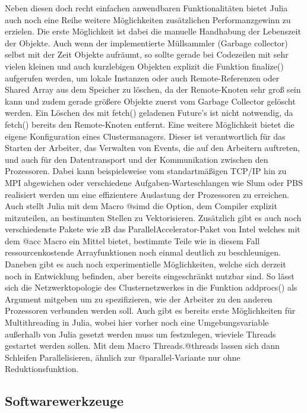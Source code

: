 \documentclass[proseminar,german,utf8]{zihpub}
\begin{document}
Neben diesen doch recht einfachen anwendbaren Funktionalitäten bietet Julia auch noch eine Reihe weitere Möglichkeiten zusätzlichen Performanzgewinn zu erzielen. Die erste Möglichkeit ist dabei die manuelle Handhabung der Lebenszeit der Objekte. Auch wenn der implementierte Müllsammler (Garbage collector) selbst mit der Zeit Objekte aufräumt, so sollte gerade bei Codezeilen mit sehr vielen kleinen und auch kurzlebigen Objekten explizit die Funktion finalize() aufgerufen werden, um lokale Instanzen oder auch Remote-Referenzen oder Shared Array aus dem Speicher zu löschen, da der Remote-Knoten sehr groß sein kann und zudem gerade größere Objekte zuerst vom Garbage Collector gelöscht werden. Ein Löschen des mit fetch() geladenen Future's ist nicht notwendig, da fetch() bereits den Remote-Knoten entfernt. Eine weitere Möglichkeit bietet die eigene Konfiguration eines Clustermanagers. Dieser ist verantwortlich für das Starten der Arbeiter, das Verwalten von Events, die auf den Arbeitern auftreten, und auch für den Datentransport und der Kommunikation zwischen den Prozessoren. Dabei kann beispielsweise vom standartmäßigen TCP/IP hin zu MPI abgewichen oder verschiedene Aufgaben-Warteschlangen wie Slum oder PBS realisiert werden um eine effizientere Auslastung der Prozessoren zu erreichen. Auch stellt Julia mit dem Macro @simd die Option, dem Compiler explizit mitzuteilen, an bestimmten Stellen zu Vektorisieren. Zusätzlich gibt es auch noch verschiedenste Pakete wie zB das ParallelAccelerator-Paket von Intel welches mit dem @acc Macro ein Mittel bietet, bestimmte Teile wie in diesem Fall ressourcenkostende Arrayfunktionen noch einmal deutlich zu beschleunigen. Daneben gibt es auch noch experimentielle Möglichkeiten, welche sich derzeit noch in Entwicklung befinden, aber bereits eingeschränkt nutzbar sind. So lässt sich die Netzwerktopologie des Clusternetzwerkes in die Funktion addprocs() als Argument mitgeben um zu spezifizieren, wie der Arbeiter zu den anderen Prozessoren verbunden werden soll. Auch gibt es bereits erste Möglichkeiten für Multithreading in Julia, wobei hier vorher noch eine Umgebungsvariable außerhalb von Julia gesetzt werden muss um festzulegen, wieviele Threads gestartet werden sollen. Mit dem Macro Threads.@threads lassen sich dann Schleifen Parallelisieren, ähnlich zur @parallel-Variante nur ohne Reduktionsfunktion.

\subsection{Softwarewerkzeuge}
\end{document}
